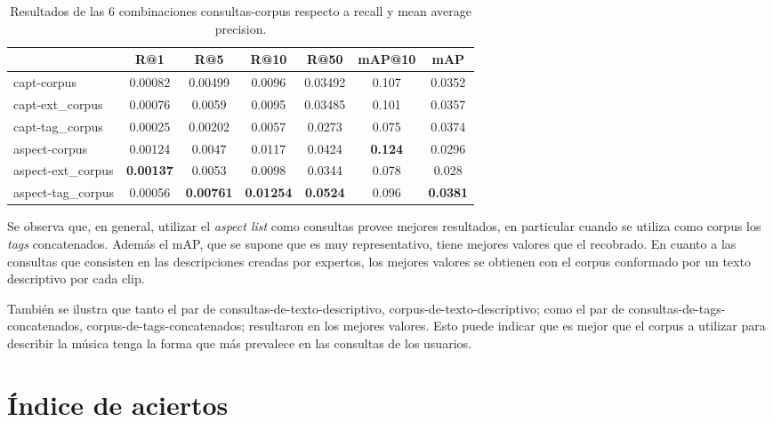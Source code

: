 \begin{table}[h]
    \footnotesize
    \centering
    \begin{tabular} { | l | c | c | c | c | c | c | }
    \hline
                      &   R@1           &   R@5   &   R@10         &   R@50          & mAP@10        &   mAP   \\ 
    \hline
    capt-corpus       & 0.00082         & 0.00499 & 0.0096         & 0.03492         & 0.107         & 0.0352 \\
    capt-ext\_corpus   & 0.00076         & 0.0059  & 0.0095         & 0.03485        & 0.101         & 0.0357  \\ 
    capt-tag\_corpus   & 0.00025         & 0.00202 & 0.0057         & 0.0273         & 0.075         & 0.0374  \\ 
    aspect-corpus     & 0.00124         & 0.0047  & 0.0117         & 0.0424          &\textbf{0.124} & 0.0296 \\ 
    aspect-ext\_corpus &\textbf{0.00137} & 0.0053  & 0.0098         & 0.0344         & 0.078         & 0.028 \\ 
    aspect-tag\_corpus & 0.00056 &\textbf{0.00761} &\textbf{0.01254} &\textbf{0.0524} & 0.096 &\textbf{0.0381} \\ 
    \hline
    \end{tabular}
    \caption{Resultados de las 6 combinaciones consultas-corpus	respecto a recall y mean average precision.}
    \label{tab:results}
\end{table}

Se observa que, en general, utilizar el \textit{aspect list} como consultas provee mejores resultados, en particular cuando se utiliza como corpus los \textit{tags} concatenados. Además el mAP, que se supone que es muy representativo, tiene mejores valores que el recobrado. En cuanto a las consultas que consisten en las descripciones creadas por expertos, los mejores valores se obtienen con el corpus conformado por un texto descriptivo por cada clip. 

También se ilustra que tanto el par de consultas-de-texto-descriptivo, corpus-de-texto-descriptivo; como el par de consultas-de-tags-concatenados, corpus-de-tags-concatenados; resultaron en los mejores valores. Esto puede indicar que es mejor que el corpus a utilizar para describir la música tenga la forma que más prevalece en las consultas de los usuarios. 

\section{Índice de aciertos}
\label{sec:experiment2}

